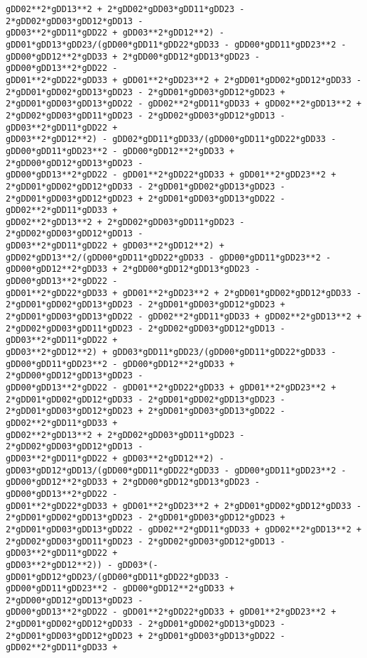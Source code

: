 \documentclass[landscape,letterpaper,10pt,english]{article}
\begin{document}
\begin{Verbatim}[commandchars=\\\{\}]
gDD02**2*gDD13**2 + 2*gDD02*gDD03*gDD11*gDD23 - 2*gDD02*gDD03*gDD12*gDD13 -
gDD03**2*gDD11*gDD22 + gDD03**2*gDD12**2) -
gDD01*gDD13*gDD23/(gDD00*gDD11*gDD22*gDD33 - gDD00*gDD11*gDD23**2 -
gDD00*gDD12**2*gDD33 + 2*gDD00*gDD12*gDD13*gDD23 - gDD00*gDD13**2*gDD22 -
gDD01**2*gDD22*gDD33 + gDD01**2*gDD23**2 + 2*gDD01*gDD02*gDD12*gDD33 -
2*gDD01*gDD02*gDD13*gDD23 - 2*gDD01*gDD03*gDD12*gDD23 +
2*gDD01*gDD03*gDD13*gDD22 - gDD02**2*gDD11*gDD33 + gDD02**2*gDD13**2 +
2*gDD02*gDD03*gDD11*gDD23 - 2*gDD02*gDD03*gDD12*gDD13 - gDD03**2*gDD11*gDD22 +
gDD03**2*gDD12**2) - gDD02*gDD11*gDD33/(gDD00*gDD11*gDD22*gDD33 -
gDD00*gDD11*gDD23**2 - gDD00*gDD12**2*gDD33 + 2*gDD00*gDD12*gDD13*gDD23 -
gDD00*gDD13**2*gDD22 - gDD01**2*gDD22*gDD33 + gDD01**2*gDD23**2 +
2*gDD01*gDD02*gDD12*gDD33 - 2*gDD01*gDD02*gDD13*gDD23 -
2*gDD01*gDD03*gDD12*gDD23 + 2*gDD01*gDD03*gDD13*gDD22 - gDD02**2*gDD11*gDD33 +
gDD02**2*gDD13**2 + 2*gDD02*gDD03*gDD11*gDD23 - 2*gDD02*gDD03*gDD12*gDD13 -
gDD03**2*gDD11*gDD22 + gDD03**2*gDD12**2) +
gDD02*gDD13**2/(gDD00*gDD11*gDD22*gDD33 - gDD00*gDD11*gDD23**2 -
gDD00*gDD12**2*gDD33 + 2*gDD00*gDD12*gDD13*gDD23 - gDD00*gDD13**2*gDD22 -
gDD01**2*gDD22*gDD33 + gDD01**2*gDD23**2 + 2*gDD01*gDD02*gDD12*gDD33 -
2*gDD01*gDD02*gDD13*gDD23 - 2*gDD01*gDD03*gDD12*gDD23 +
2*gDD01*gDD03*gDD13*gDD22 - gDD02**2*gDD11*gDD33 + gDD02**2*gDD13**2 +
2*gDD02*gDD03*gDD11*gDD23 - 2*gDD02*gDD03*gDD12*gDD13 - gDD03**2*gDD11*gDD22 +
gDD03**2*gDD12**2) + gDD03*gDD11*gDD23/(gDD00*gDD11*gDD22*gDD33 -
gDD00*gDD11*gDD23**2 - gDD00*gDD12**2*gDD33 + 2*gDD00*gDD12*gDD13*gDD23 -
gDD00*gDD13**2*gDD22 - gDD01**2*gDD22*gDD33 + gDD01**2*gDD23**2 +
2*gDD01*gDD02*gDD12*gDD33 - 2*gDD01*gDD02*gDD13*gDD23 -
2*gDD01*gDD03*gDD12*gDD23 + 2*gDD01*gDD03*gDD13*gDD22 - gDD02**2*gDD11*gDD33 +
gDD02**2*gDD13**2 + 2*gDD02*gDD03*gDD11*gDD23 - 2*gDD02*gDD03*gDD12*gDD13 -
gDD03**2*gDD11*gDD22 + gDD03**2*gDD12**2) -
gDD03*gDD12*gDD13/(gDD00*gDD11*gDD22*gDD33 - gDD00*gDD11*gDD23**2 -
gDD00*gDD12**2*gDD33 + 2*gDD00*gDD12*gDD13*gDD23 - gDD00*gDD13**2*gDD22 -
gDD01**2*gDD22*gDD33 + gDD01**2*gDD23**2 + 2*gDD01*gDD02*gDD12*gDD33 -
2*gDD01*gDD02*gDD13*gDD23 - 2*gDD01*gDD03*gDD12*gDD23 +
2*gDD01*gDD03*gDD13*gDD22 - gDD02**2*gDD11*gDD33 + gDD02**2*gDD13**2 +
2*gDD02*gDD03*gDD11*gDD23 - 2*gDD02*gDD03*gDD12*gDD13 - gDD03**2*gDD11*gDD22 +
gDD03**2*gDD12**2)) - gDD03*(-gDD01*gDD12*gDD23/(gDD00*gDD11*gDD22*gDD33 -
gDD00*gDD11*gDD23**2 - gDD00*gDD12**2*gDD33 + 2*gDD00*gDD12*gDD13*gDD23 -
gDD00*gDD13**2*gDD22 - gDD01**2*gDD22*gDD33 + gDD01**2*gDD23**2 +
2*gDD01*gDD02*gDD12*gDD33 - 2*gDD01*gDD02*gDD13*gDD23 -
2*gDD01*gDD03*gDD12*gDD23 + 2*gDD01*gDD03*gDD13*gDD22 - gDD02**2*gDD11*gDD33 +

\end{Verbatim}
\end{document}
